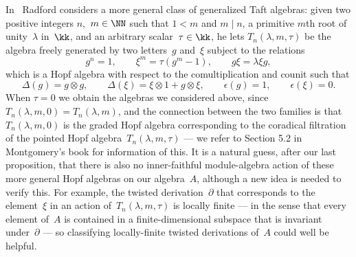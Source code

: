 In~\cite{Radford} Radford considers a more general class of generalized
Taft algebras: given two positive integers $n$,~$m\in\NN$ such that $1<m$
and $m\mid n$, a primitive $m$th root of unity~$\lambda$ in~$\kk$, and an
arbitrary scalar~$\tau\in\kk$, he lets $T_n(\lambda,m,\tau)$ be the algebra
freely generated by two letters~$g$ and~$\xi$ subject to the relations
  \[ 
  g^n = 1,
  \qquad
  \xi^m = \tau(g^m-1),
  \qquad
  g\xi = \lambda\xi g,
  \]
which is a Hopf algebra with respect to the comultiplication and counit such that
  \[
  \Delta(g) = g\otimes g,
  \qquad
  \Delta(\xi) = \xi\otimes1+g\otimes\xi,
  \qquad
  \epsilon(g) = 1,
  \qquad
  \epsilon(\xi) = 0.
  \]
When $\tau=0$ we obtain the algebras we considered above, since
$T_n(\lambda,m,0)=T_n(\lambda,m)$, and the connection between the two
families is that $T_n(\lambda,m,0)$ is the graded Hopf algebra
corresponding to the coradical filtration of the pointed Hopf
algebra~$T_n(\lambda,m,\tau)$ --- we refer to Section 5.2 in Montgomery's
book \cite{Montgomery} for information of this. It is a natural guess,
after our last proposition, that there is also no inner-faithful
module-algebra action of these more general Hopf algebras on our
algebra~$A$, although a new idea is needed to verify this. For example, the
twisted derivation~$\partial$ that corresponds to the element~$\xi$ in an action
of~$T_n(\lambda,m,\tau)$ is locally finite --- in the sense that every
element of~$A$ is contained in a finite-dimensional subspace that is
invariant under~$\partial$ --- so classifying locally-finite twisted
derivations of~$A$ could well be helpful.

